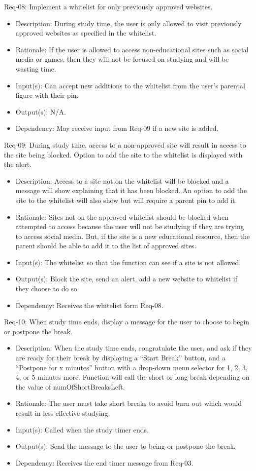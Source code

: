 \documentclass[12pt]{article}
\begin{document}
Req-08: Implement a whitelist for only previously approved websites.  
\begin{itemize}
    \item Description: During study time, the user is only allowed to visit previously approved websites as specified in the whitelist. 
    \item Rationale: If the user is allowed to access non-educational sites such as social media or games, then they will not be focused on studying and will be wasting time. 
    \item Input(s): Can accept new additions to the whitelist from the user’s parental figure with their pin.
    \item Output(s): N/A.
    \item Dependency: May receive input from Req-09 if a new site is added.  
\end{itemize}
Req-09: During study time, access to a non-approved site will result in access to the site being blocked. Option to add the site to the whitelist is displayed with the alert.  
\begin{itemize}
    \item Description: Access to a site not on the whitelist will be blocked and a message will show explaining that it has been blocked. An option to add the site to the whitelist will also show but will require a parent pin to add it.  
    \item Rationale: Sites not on the approved whitelist should be blocked when attempted to access because the user will not be studying if they are trying to access social media. But, if the site is a new educational resource, then the parent should be able to add it to the list of approved sites. 
    \item Input(s): The whitelist so that the function can see if a site is not allowed.  
    \item Output(s): Block the site, send an alert, add a new website to whitelist if they choose to do so.
    \item Dependency: Receives the whitelist form Req-08.  
\end{itemize}
Req-10: When study time ends, display a message for the user to choose to begin or postpone the break.  
\begin{itemize}
    \item Description: When the study time ends, congratulate the user, and ask if they are ready for their break by displaying a “Start Break” button, and a “Postpone for x minutes” button with a drop-down menu selector for 1, 2, 3, 4, or 5 minutes more. Function will call the short or long break depending on the value of numOfShortBreaksLeft.  
    \item Rationale: The user must take short breaks to avoid burn out which would result in less effective studying.  
    \item Input(s): Called when the study timer ends.
    \item Output(s): Send the message to the user to being or postpone the break.  
    \item Dependency: Receives the end timer message from Req-03.
\end{itemize}
\end{document}
